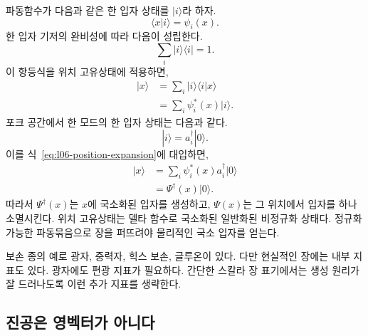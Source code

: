 파동함수가 다음과 같은 한 입자 상태를 \(|i\rangle\)라 하자.
\begin{equation}
\langle x|i\rangle=\psi_i(x).
\end{equation}
한 입자 기저의 완비성에 따라 다음이 성립한다.
\begin{equation}
\sum_i|i\rangle\langle i|=1.
\label{eq:l06-completeness}
\end{equation}
이 항등식을 위치 고유상태에 적용하면,
\begin{align}
|x\rangle
&=\sum_i|i\rangle\langle i|x\rangle \\
&=\sum_i\psi_i^*(x)|i\rangle.
\label{eq:l06-position-expansion}
\end{align}
포크 공간에서 한 모드의 한 입자 상태는 다음과 같다.
\begin{equation}
|i\rangle=a_i^\dagger|0\rangle.
\end{equation}
이를 식~\eqref{eq:l06-position-expansion}에 대입하면,
\begin{align}
|x\rangle
&=\sum_i\psi_i^*(x)a_i^\dagger|0\rangle \\
&=\Psi^\dagger(x)|0\rangle.
\label{eq:l06-local-creation}
\end{align}
따라서 \(\Psi^\dagger(x)\)는 \(x\)에 국소화된 입자를 생성하고, \(\Psi(x)\)는 그 위치에서 입자를 하나 소멸시킨다. 위치 고유상태는 델타 함수로 국소화된 일반화된 비정규화 상태다. 정규화 가능한 파동묶음으로 장을 퍼뜨려야 물리적인 국소 입자를 얻는다.

\begin{classroomqa}\end{classroomqa}

보손 종의 예로 광자, 중력자, 힉스 보손, 글루온이 있다. 다만 현실적인 장에는 내부 지표도 있다. 광자에도 편광 지표가 필요하다. 간단한 스칼라 장 표기에서는 생성 원리가 잘 드러나도록 이런 추가 지표를 생략한다.

\subsection{진공은 영벡터가 아니다}

